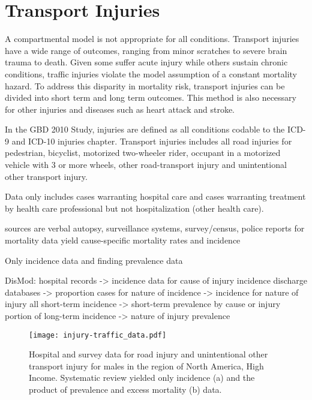 \chapter{Transport Injuries}
\label{applications-double_dismod}

A compartmental model is not appropriate for all conditions.  Transport injuries have a wide range of outcomes, ranging from minor scratches to severe brain trauma to death.  Given some suffer acute injury while others sustain chronic conditions, traffic injuries violate the model assumption of a constant mortality hazard.  To address this disparity in mortality risk, transport injuries can be divided into short term and long term outcomes.  This method is also necessary for other injuries and diseases such as heart attack and stroke.

In the GBD 2010 Study, injuries are defined as all conditions codable to the ICD-9 and ICD-10 injuries chapter.  Transport injuries includes all road injuries for pedestrian, bicyclist, motorized two-wheeler rider, occupant in a motorized vehicle with 3 or more wheels, other road-transport injury and unintentional other transport injury.



Data only includes cases warranting hospital care and cases warranting treatment by health care professional but not hospitalization (other health care).

sources are verbal autopsy, surveillance systems, survey/census, police reports for mortality data yield cause-specific mortality rates and incidence



Only incidence data and finding prevalence data


DisMod:
hospital records -> incidence data for cause of injury incidence
discharge databases -> proportion cases for nature of incidence -> incidence for nature of injury
all short-term incidence -> short-term prevalence by cause or injury
portion of long-term incidence -> nature of injury prevalence





    \begin{figure}[h]
        \begin{center}
            \texttt{[image: injury-traffic\_data.pdf]}
            \caption{Hospital and survey data for road injury and unintentional other transport injury for males in the region of North America, High Income.  Systematic review yielded only incidence (a) and the product of prevalence and excess mortality (b) data.}
            \label{fig:app-injury traffic data}
        \end{center}
    \end{figure}

